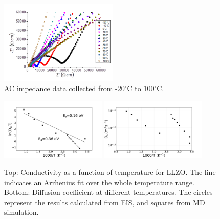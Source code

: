 \documentclass[twoside,twocolumn,9pt]{article}
\begin{document}
\begin{figure}[t]
\centering
\includegraphics[width=0.5\textwidth]{Pics/impedance.png}
\caption{AC impedance data collected from -20$^\circ$C to 100$^\circ$C.}
\label{fig:impedance}
\end{figure}

\begin{figure}[t]
\centering
\includegraphics[width=0.45\textwidth]{Pics/arrhenius-plot.pdf}
\includegraphics[width=0.45\textwidth]{Pics/DiffusionCoefficient.pdf}
\caption{Top: Conductivity as a function of temperature for LLZO. The line indicates an Arrhenius fit over the whole temperature range. Bottom: Diffusion coefficient at different temperatures. The circles represent the results calculated from EIS, and squares from MD simulation.}
\label{fig:arrhenius-plot}
\end{figure}
\end{document}

